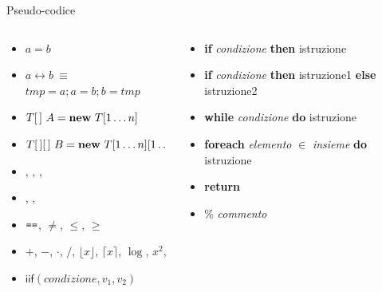 \begin{frame}{Pseudo-codice}

{\small 
\begin{columns}
\begin{column}{0.485\textwidth}
\begin{itemize}
\item $a = b$
\item $a \leftrightarrow b \ \equiv {}$ \\ 
  $\mathit{tmp} = a; a = b; b = \mathit{tmp}$
\item $T[\,]\ A = \NEW\ T[1 \mldots n]$ \\
\item $T[\,][\,]\ B = \NEW\ T[1 \mldots n][1 \mldots m]$ \\
\item \INTEGER, \REAL, \BOOLEAN, \INTEGER
\item \AND, \OR, \NOT
\item $\operatorname*{\texttt{==}}$, $\neq$, $\leq$, $\geq$
\item $+$, $-$, $\cdot$, $/$, $\lfloor x \rfloor$, $\lceil x \rceil$, $\log$, $x^2$, \mldots
\item $\textsf{iif}(\mathit{condizione}, v_1, v_2)$ 
\end{itemize}
\end{column}
\begin{column}{0.485\textwidth}
\begin{itemize}
\item \textbf{if} \emph{condizione} \textbf{then} istruzione
\item \textbf{if} \emph{condizione} \textbf{then} istruzione1 \textbf{else} istruzione2
\item \textbf{while} \emph{condizione} \textbf{do} istruzione
\item \textbf{foreach} \emph{elemento} $\in$ \emph{insieme} \textbf{do} istruzione
\item \textbf{return}
\item \% \emph{commento}
\end{itemize}
\end{column}
\end{columns}

}
\end{frame}

